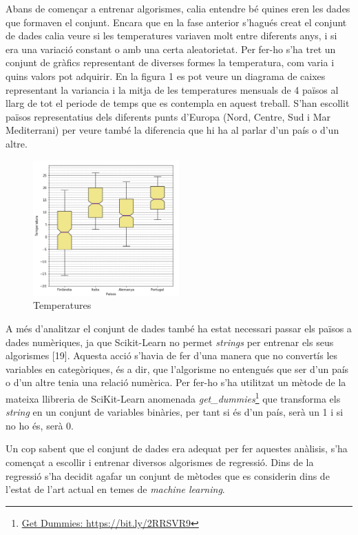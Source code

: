 \documentclass[10pt,a4paper,twocolumn,twoside]{article}
\begin{document}
Abans de començar a entrenar algorismes, calia entendre bé quines eren les dades que formaven el conjunt. Encara que en la fase anterior s'hagués creat el conjunt de dades calia veure si les temperatures variaven molt entre diferents anys, i si era una variació constant o amb una certa aleatorietat. Per fer-ho s'ha tret un conjunt de gràfics representant de diverses formes la temperatura, com varia i quins valors pot adquirir. En la figura 1 es pot veure un diagrama de caixes representant la variancia i la mitja de les temperatures mensuals de 4 països al llarg de tot el periode de temps que es contempla en aquest treball. S'han escollit països representatius dels diferents punts d'Europa (Nord, Centre, Sud i Mar Mediterrani) per veure també la diferencia que hi ha al parlar d'un país o d'un altre.
\begin{figure}[!h]
\centering
	\includegraphics[width=0.5\textwidth]{../img/tempMitjaVariacioPaisos}
	\caption{Temperatures }
	\label{fig-tempMitjaPaisos}
\end{figure}

A més d'analitzar el conjunt de dades també ha estat necessari passar els països a dades numèriques, ja que Scikit-Learn no permet \textit{strings} per entrenar els seus algorismes [19]. Aquesta acció s'havia de fer d'una manera que no convertís les variables en categòriques, és a dir, que l'algorisme no entengués que ser d'un país o d'un altre tenia una relació numèrica. Per fer-ho s'ha utilitzat un mètode de la mateixa llibreria de SciKit-Learn anomenada \textit{get\_dummies}\footnote{\url{Get Dummies: https://bit.ly/2RRSVR9}} que transforma els \textit{string} en un conjunt de variables binàries, per tant si és d'un país, serà un 1 i si no ho és, serà 0.

Un cop sabent que el conjunt de dades era adequat per fer aquestes anàlisis, s'ha començat a escollir i entrenar diversos algorismes de regressió. Dins de la regressió s'ha decidit agafar un conjunt de mètodes que es considerin dins de l'estat de l'art actual en temes de \textit{machine learning}.
\end{document}
